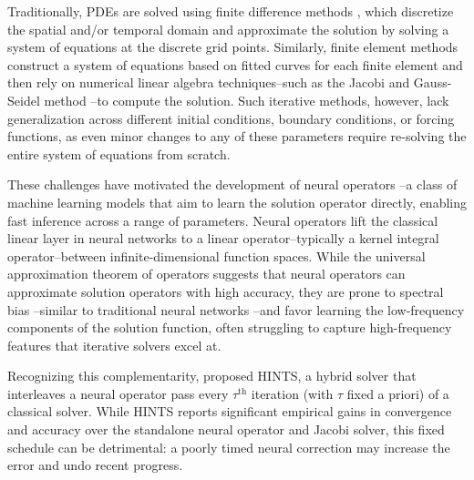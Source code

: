 \documentclass{article} %
\newcommand\ambuj[1]{\textcolor{red}{AT: #1}}
\begin{document}
Traditionally, PDEs are solved using finite difference methods \citep{smith1985numerical,leveque2007finite}, which discretize the spatial and/or temporal domain and approximate the solution by solving a system of equations at the discrete grid points. Similarly, finite element methods \citep{hughes2003finite,bathe2006finite,brenner2008mathematical} construct a system of equations based on fitted curves for each finite element and then rely on numerical linear algebra techniques--such as the Jacobi and Gauss-Seidel method \citep{saad2003iterative}--to compute the solution. 
Such iterative methods, however, lack generalization across different initial conditions, boundary conditions, or forcing functions, as even minor changes to any of these parameters require re-solving the entire system of equations from scratch. 

These challenges have motivated the development of neural operators \citep{kovachki2023neural}--a class of machine learning models that aim to learn the solution operator directly, enabling fast inference across a range of parameters. Neural operators lift the classical linear layer in neural networks to a linear operator--typically a kernel integral operator--between infinite-dimensional function spaces. While the universal approximation theorem of operators \citep{chen1995universal} suggests that neural operators can approximate solution operators with high accuracy, they are prone to spectral bias \citep{liu2021multiscale,liu2024mitigating,you2024mscalefno,khodakarami2025mitigating,xu2025understanding}--similar to traditional neural networks \citep{rahaman2019spectral,xu2019frequency,luo2019theory}--and favor learning the low-frequency components of the solution function, often struggling to capture high-frequency features that iterative solvers excel at. 

Recognizing this complementarity, \citet{zhang2024blending} proposed HINTS, a hybrid solver that 
interleaves a neural operator pass every $\tau^{\text{th}}$ iteration (with $\tau$ fixed a priori) of a classical solver.
While HINTS reports significant empirical gains in convergence and accuracy over the standalone neural operator and Jacobi solver, this fixed schedule can be detrimental: a poorly timed neural correction may increase the error and undo recent progress. 
\end{document}
